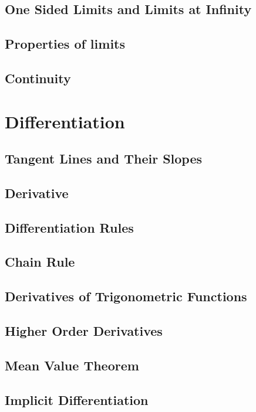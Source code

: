 \documentclass[12pt]{memoir}
\begin{document}
    \section{One Sided Limits and Limits at Infinity}
    
    \section{Properties of limits}
    
    \section{Continuity}
    


\chapter{Differentiation}
    \section{Tangent Lines and Their Slopes}
    
    \section{Derivative}
    
    \section{Differentiation Rules}
    
    \section{Chain Rule}
    
    \section{Derivatives of Trigonometric Functions}
    
    \section{Higher Order Derivatives}
    
    \section{Mean Value Theorem}
    
    \section{Implicit Differentiation}
    
\end{document}
